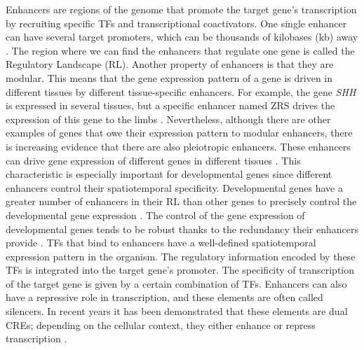 Enhancers are regions of the genome that promote the target gene's transcription by recruiting specific TFs and transcriptional coactivators. One single enhancer can have several target promoters, which can be thousands of kilobases (kb) away \parencite{tena_evolutionarily_2011}. The region where we can find the enhancers that regulate one gene is called the Regulatory Landscape (RL). Another property of enhancers is that they are modular. This means that the gene expression pattern of a gene is driven in different tissues by different tissue-specific enhancers. For example, the gene \textit{SHH} is expressed in several tissues, but a specific enhancer named ZRS drives the expression of this gene to the limbs \parencite{lettice_long-range_2003}. Nevertheless, although there are other examples of genes that owe their expression pattern to modular enhancers, there is increasing evidence that there are also pleiotropic enhancers. These enhancers can drive gene expression of different genes in different tissues \parencite{singh_enhancer_2021}. This characteristic is especially important for developmental genes since different enhancers control their spatiotemporal specificity. Developmental genes have a greater number of enhancers in their RL than other genes to precisely control the developmental gene expression \parencite{calle-mustienes_functional_2005}. The control of the gene expression of developmental genes tends to be robust thanks to the redundancy their enhancers provide \parencite{osterwalder_enhancer_2018, waymack_shadow_2020}. TFs that bind to enhancers have a well-defined spatiotemporal expression pattern in the organism. The regulatory information encoded by these TFs is integrated into the target gene's promoter. The specificity of transcription of the target gene is given by a certain combination of TFs. Enhancers can also have a repressive role in transcription, and these elements are often called silencers. In recent years it has been demonstrated that these elements are dual CREs; depending on the cellular context, they either enhance or repress transcription \parencite{santos-pereira_pioneer_2019, gisselbrecht_transcriptional_2020, segert_transcriptional_2021}.

